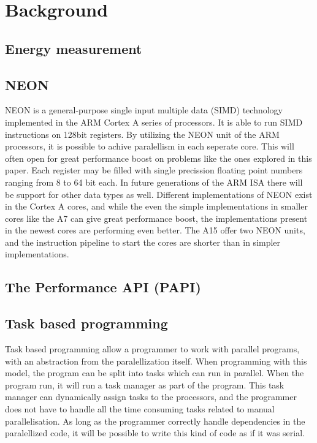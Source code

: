 \chapter[Background]{Background}

\section{Energy measurement}

\section{NEON}
NEON is a general-purpose single input multiple data (SIMD) technology implemented in the ARM Cortex A series of processors.
It is able to run SIMD instructions on 128bit registers.
By utilizing the NEON unit of the ARM processors, it is possible to achive paralellism in each seperate core.
This will often open for great performance boost on problems like the ones explored in this paper.
Each register may be filled with single precission floating point numbers ranging from 8 to 64 bit each.
In future generations of the ARM ISA there will be support for other data types as well.
Different implementations of NEON exist in the Cortex A cores, and while the even the simple implementations in smaller cores like the A7 can give great performance boost, the implementations present in the newest cores are performing even better.
The A15 offer two NEON units, and the instruction pipeline to start the cores are shorter than in simpler implementations.

\section{The Performance API (PAPI)}

\section{Task based programming}
Task based programming allow a programmer to work with parallel programs, with an abstraction from the paralellization itself.
When programming with this model, the program can be split into tasks which can run in parallel.
When the program run, it will run a task manager as part of the program.
This task manager can dynamically assign tasks to the processors, and the programmer does not have to handle all the time consuming tasks related to manual parallelisation.
As long as the programmer correctly handle dependencies in the paralellized code, it will be possible to write this kind of code as if it was serial.

